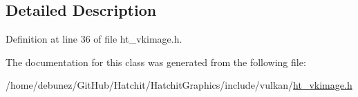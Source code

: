 \subsection{Detailed Description}


Definition at line 36 of file ht\+\_\+vkimage.\+h.



The documentation for this class was generated from the following file\+:\begin{DoxyCompactItemize}
\item 
/home/debunez/\+Git\+Hub/\+Hatchit/\+Hatchit\+Graphics/include/vulkan/\hyperlink{ht__vkimage_8h}{ht\+\_\+vkimage.\+h}\end{DoxyCompactItemize}
